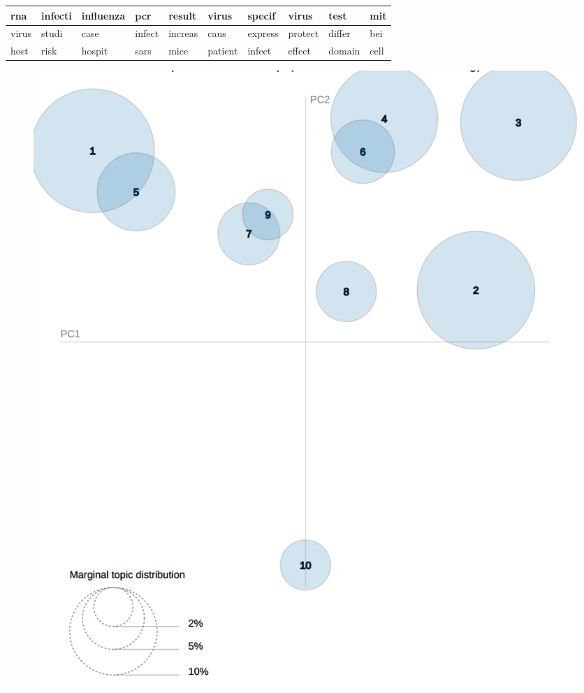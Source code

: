 \documentclass{beamer}
\begin{document}
\begin{frame}
\begin{table}[]
{\begin{tabular}{|l|l|l|l|l|l|l|l|l|l|}
rna              & infecti          & influenza        & pcr              & result           & virus            & specif           & virus            & test             & mit               \\ \hline
virus            & studi            & case             & infect           & increas          & caus             & express          & protect          & differ           & bei               \\ \hline
host             & risk             & hospit           & sars             & mice             & patient          & infect           & effect           & domain           & cell              \\ \hline
\end{tabular}}
\end{table}

\begin{figure}
\includegraphics[width=0.4\linewidth]{../visualizations/lda_before_visualization.png}
\end{figure}

\end{frame}
\end{document}
